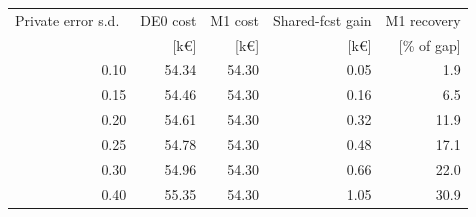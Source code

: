 \begin{tabular*}{\textwidth}{@{\extracolsep{\fill}}rrrrr@{}}
\toprule
Private error s.d.\ & DE0 cost & M1 cost & Shared-fcst gain & M1 recovery \\
 & [k\euro] & [k\euro] & [k\euro] & [\% of gap] \\
\midrule
0.10 & 54.34 & 54.30 & 0.05 & 1.9 \\
0.15 & 54.46 & 54.30 & 0.16 & 6.5 \\
0.20 & 54.61 & 54.30 & 0.32 & 11.9 \\
0.25 & 54.78 & 54.30 & 0.48 & 17.1 \\
0.30 & 54.96 & 54.30 & 0.66 & 22.0 \\
0.40 & 55.35 & 54.30 & 1.05 & 30.9 \\
\bottomrule
\end{tabular*}
